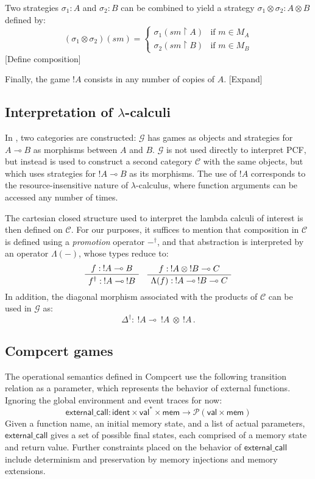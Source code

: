\documentclass[sigplan,10pt,review,anonymous]{acmart}
\newcommand{\kw}[1]{\ensuremath{ \textsf{#1} }}
\begin{document}
Two strategies $\sigma_1 : A$ and $\sigma_2 : B$
can be combined to yield a strategy $\sigma_1 \otimes \sigma_2 : A \otimes B$
defined by:
\[
    (\sigma_1 \otimes \sigma_2)(sm) =
      \begin{cases}
        \sigma_1(sm \upharpoonright A) & \mbox{if } m \in M_A \\
        \sigma_2(sm \upharpoonright B) & \mbox{if } m \in M_B
      \end{cases}
\]
[Define composition]

Finally, the game $!A$ consists in any number of copies of $A$.
[Expand]


\subsection{Interpretation of $\lambda$-calculi} %

In \citep{gamesem99},
two categories are constructed:
$\mathcal{G}$ has games as objects
and strategies for $A \multimap B$
as morphisms between $A$ and $B$.
$\mathcal{G}$ is not used directly to interpret PCF,
but instead is used to construct a second category
$\mathcal{C}$ with the same objects,
but which uses strategies for $!A \multimap B$
as its morphisms.
The use of $!A$ corresponds to the resource-insensitive nature
of $\lambda$-calculus,
where function arguments can be accessed
any number of times.

The cartesian closed structure used to interpret
the lambda calculi of interest
is then defined on $\mathcal{C}$.
For our purposes,
it suffices to mention that
composition in $\mathcal{C}$ is defined using
a \emph{promotion} operator $-^\dagger$,
and that abstraction
is interpreted by an operator $\Lambda(-)$,
whose types reduce to:
\[
  \AxiomC{$f : \: !A \multimap B$}
  \UnaryInfC{$f^\dagger : \: !A \multimap \: !B$}
  \DisplayProof
  \quad
  \AxiomC{$f : \: !A \: \otimes \: !B \multimap C$}
  \UnaryInfC{$\Lambda(f) : \: !A \multimap \: !B \multimap C$}
  \DisplayProof
\]
In addition,
the diagonal morphism associated with the products of $\mathcal{C}$
can be used in $\mathcal{G}$ as:
\[
  \Delta^\dagger : \: !A \multimap \: !A \: \otimes \: !A \,.
\]


\subsection{Compcert games} %

The operational semantics defined in Compcert
use the following transition relation as a parameter,
which represents the behavior of external functions.
Ignoring the global environment and event traces for now:
\[
  \kw{external\_call} :
    \kw{ident} \times \kw{val}^* \times \kw{mem} \rightarrow
    \mathcal{P}(\kw{val} \times \kw{mem})
\]
Given a function name,
an initial memory state,
and a list of actual parameters,
$\kw{external\_call}$ gives a set of possible final states,
each comprised of a memory state and return value.
Further constraints placed on the behavior of
\kw{external\_call} include determinism
and preservation by memory injections and memory extensions.
\end{document}
